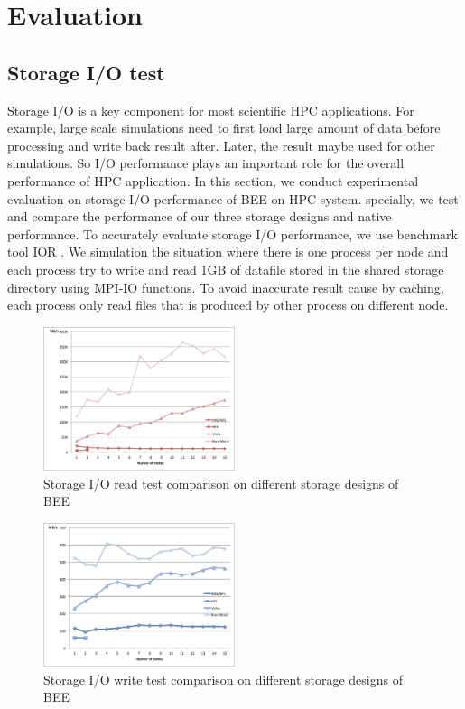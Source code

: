 \section{Evaluation}
\subsection{Storage I/O test}

	Storage I/O is a key component for most scientific HPC applications. For example, large scale simulations need to first load large amount of data before processing and write back result after. Later, the result maybe used for other simulations. So I/O performance plays an important role for the overall performance of HPC application. In this section, we conduct experimental evaluation on storage I/O performance of BEE on HPC system. specially, we test and compare the performance of our three storage designs and native performance. To accurately evaluate storage I/O performance, we use benchmark tool IOR \cite{IOR}. We simulation the situation where there is one process per node and each process try to write and read 1GB of datafile stored in the shared storage directory using MPI-IO functions. To avoid inaccurate result cause by caching, each process only read files that is produced by other process on different node. 

\begin{figure}[h]
    \centering
    \caption{Storage I/O read test comparison on different storage designs of BEE}
    \label{io-test-read}
    \includegraphics[width=0.5\textwidth]{figures/io-read-seq-test.pdf}
\end{figure}

\begin{figure}[h]
    \centering
    \caption{Storage I/O write test comparison on different storage designs of BEE}
    \label{io-test-write}
    \includegraphics[width=0.5\textwidth]{figures/io-write-seq-test.pdf}
\end{figure}

